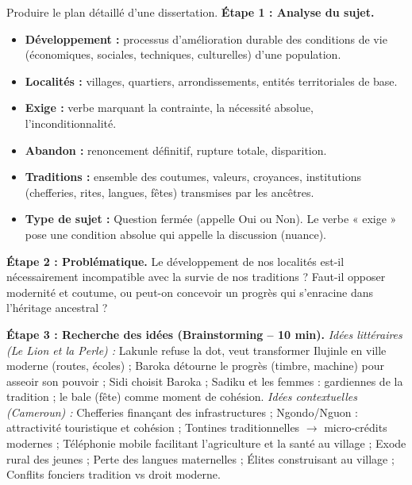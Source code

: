 \documentclass[11pt]{article}
\begin{document}
\begin{exoresolu}
Produire le plan détaillé d'une dissertation.
\tcblower
\textbf{Étape 1 : Analyse du sujet.}
\begin{itemize}
\item \textbf{Développement :} processus d'amélioration durable des conditions de vie (économiques, sociales, techniques, culturelles) d'une population.
\item \textbf{Localités :} villages, quartiers, arrondissements, entités territoriales de base.
\item \textbf{Exige :} verbe marquant la contrainte, la nécessité absolue, l'inconditionnalité.
\item \textbf{Abandon :} renoncement définitif, rupture totale, disparition.
\item \textbf{Traditions :} ensemble des coutumes, valeurs, croyances, institutions (chefferies, rites, langues, fêtes) transmises par les ancêtres.
\item \textbf{Type de sujet :} Question fermée (appelle Oui ou Non). Le verbe « exige » pose une condition absolue qui appelle la discussion (nuance).
\end{itemize}

\textbf{Étape 2 : Problématique.}
Le développement de nos localités est-il nécessairement incompatible avec la survie de nos traditions ? Faut-il opposer modernité et coutume, ou peut-on concevoir un progrès qui s'enracine dans l'héritage ancestral ?

\textbf{Étape 3 : Recherche des idées (Brainstorming -- 10 min).}
\textit{Idées littéraires (Le Lion et la Perle) :} Lakunle refuse la dot, veut transformer Ilujinle en ville moderne (routes, écoles) ; Baroka détourne le progrès (timbre, machine) pour asseoir son pouvoir ; Sidi choisit Baroka ; Sadiku et les femmes : gardiennes de la tradition ; le bale (fête) comme moment de cohésion.
\textit{Idées contextuelles (Cameroun) :} Chefferies finançant des infrastructures ; Ngondo/Nguon : attractivité touristique et cohésion ; Tontines traditionnelles $\rightarrow$ micro-crédits modernes ; Téléphonie mobile facilitant l'agriculture et la santé au village ; Exode rural des jeunes ; Perte des langues maternelles ; Élites construisant au village ; Conflits fonciers tradition vs droit moderne.


\end{exoresolu}
\end{document}
